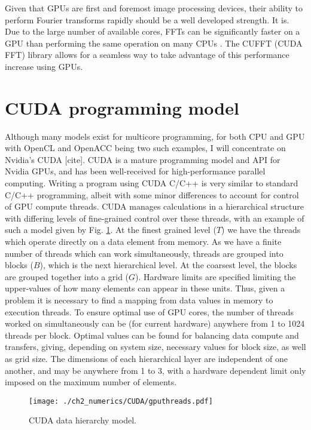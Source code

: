 Given that GPUs are first and foremost image processing devices, their ability to perform Fourier transforms rapidly should be a well developed strength. It is. Due to the large number of available cores, FFTs can be significantly faster on a GPU than performing the same operation on many CPUs \cite{AO:Morgan_ORiordan_pra_2013}. The CUFFT (CUDA FFT) library allows for a seamless way to take advantage of this performance increase using GPUs.

\section{CUDA programming model}
Although many models exist for multicore programming, for both CPU and GPU with OpenCL and OpenACC being two such examples, I will concentrate on Nvidia's CUDA [cite]. CUDA is a mature programming model and API for Nvidia GPUs, and has been well-received for high-performance parallel computing. Writing a program using CUDA C/C++ is very similar to standard C/C++ programming, albeit with some minor differences to account for control of GPU compute threads. CUDA manages calculations in a hierarchical structure with differing levels of fine-grained control over these threads, with an example of such a model given by Fig. \ref{fig:gpu_threads}. At the finest grained level ($T$) we have the threads which operate directly on a data element from memory. As we have a finite number of threads which can work simultaneously, threads are grouped into blocks ($B$), which is the next hierarchical level. At the coarsest level, the blocks are grouped together into a grid ($G$). Hardware limits are specified limiting the upper-values of how many elements can appear in these units. Thus, given a problem it is necessary to find a mapping from data values in memory to execution threads. To ensure optimal use of GPU cores, the number of threads worked on simultaneously can be (for current hardware) anywhere from 1 to 1024 threads per block. Optimal values can be found for balancing data compute and transfers, giving, depending on system size, necessary values for block size, as well as grid size. The dimensions of each hierarchical layer are independent of one another, and may be anywhere from 1 to 3, with a hardware dependent limit only imposed on the maximum number of elements.

\begin{figure}[tb]
    \centering
    \texttt{[image: ./ch2\_numerics/CUDA/gputhreads.pdf]}
    \caption{CUDA data hierarchy model.}
    \label{fig:gpu_threads}
\end{figure}


